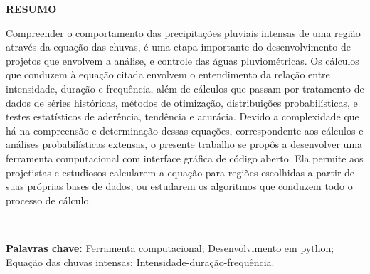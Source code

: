 \thispagestyle{empty}

\singlespacing
\begin{center}
	\textbf{RESUMO}
\end{center}

\noindent Compreender o comportamento das precipitações pluviais intensas de uma região através da equação das chuvas, é uma etapa importante do desenvolvimento de projetos que envolvem a análise, e controle das águas pluviométricas. Os cálculos que conduzem à equação citada envolvem o entendimento da relação entre intensidade, duração e frequência, além de cálculos que passam por tratamento de dados de séries históricas, métodos de otimização, distribuições probabilísticas, e testes estatísticos de aderência, tendência e acurácia. Devido a complexidade que há na compreensão e determinação dessas equações, correspondente aos cálculos e análises probabilísticas extensas, o presente trabalho se propôs a desenvolver uma ferramenta computacional com interface gráfica de código aberto. Ela permite aos projetistas e estudiosos calcularem a equação para regiões escolhidas a partir de suas próprias bases de dados, ou estudarem os algoritmos que conduzem todo o processo de cálculo.

\ \

\noindent \textbf{Palavras chave:} Ferramenta computacional; Desenvolvimento em python; Equação das chuvas intensas; Intensidade-duração-frequência.
\newpage
